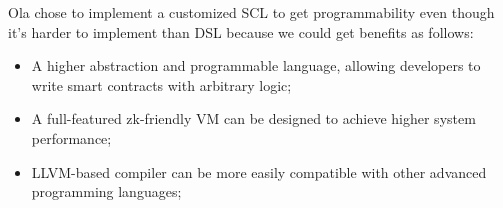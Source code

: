 Ola chose to implement a customized SCL to get programmability even though it's harder to implement than DSL because we could get benefits as follows:
 \begin{itemize}
 \item A higher abstraction and programmable language, allowing developers to write smart contracts with arbitrary logic;
 \item A full-featured zk-friendly VM can be designed to achieve higher system performance;
 \item LLVM-based compiler can be more easily compatible with other advanced programming languages;
\end{itemize}